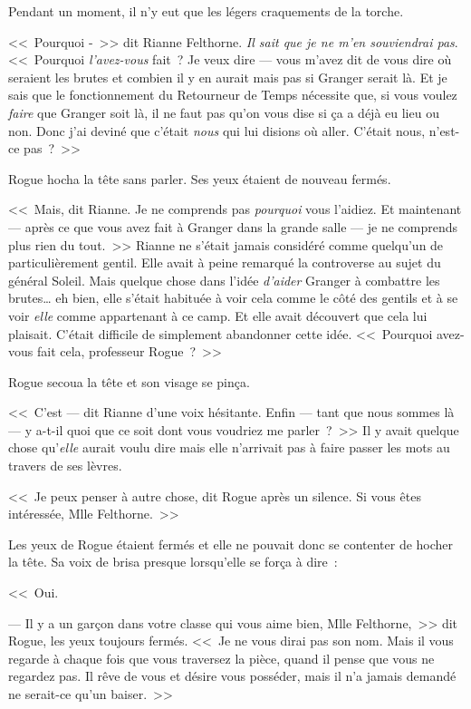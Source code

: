 Pendant un moment, il n'y eut que les légers craquements de la torche.

<<~Pourquoi -~>> dit Rianne Felthorne. \emph{Il sait que je ne m'en souviendrai pas}. <<~Pourquoi \emph{l'avez-vous} fait~? Je veux dire — vous m'avez dit de vous dire où seraient les brutes et combien il y en aurait mais pas si Granger serait là. Et je sais que le fonctionnement du Retourneur de Temps nécessite que, si vous voulez \emph{faire} que Granger soit là, il ne faut pas qu'on vous dise si ça a déjà eu lieu ou non. Donc j'ai deviné que c'était \emph{nous} qui lui disions où aller. C'était nous, n'est-ce pas~?~>>

Rogue hocha la tête sans parler. Ses yeux étaient de nouveau fermés.

<<~Mais, dit Rianne. Je ne comprends pas \emph{pourquoi} vous l'aidiez. Et maintenant — après ce que vous avez fait à Granger dans la grande salle — je ne comprends plus rien du tout.~>> Rianne ne s'était jamais considéré comme quelqu'un de particulièrement gentil. Elle avait à peine remarqué la controverse au sujet du général Soleil. Mais quelque chose dans l'idée \emph{d'aider} Granger à combattre les brutes… eh bien, elle s'était habituée à voir cela comme le côté des gentils et à se voir \emph{elle} comme appartenant à ce camp. Et elle avait découvert que cela lui plaisait. C'était difficile de simplement abandonner cette idée. <<~Pourquoi avez-vous fait cela, professeur Rogue~?~>>

Rogue secoua la tête et son visage se pinça.

<<~C'est — dit Rianne d'une voix hésitante. Enfin — tant que nous sommes là — y a-t-il quoi que ce soit dont vous voudriez me parler~?~>> Il y avait quelque chose qu'\emph{elle} aurait voulu dire mais elle n'arrivait pas à faire passer les mots au travers de ses lèvres.

<<~Je peux penser à autre chose, dit Rogue après un silence. Si vous êtes intéressée, Mlle Felthorne.~>>

Les yeux de Rogue étaient fermés et elle ne pouvait donc se contenter de hocher la tête. Sa voix de brisa presque lorsqu'elle se força à dire~:

<<~Oui.

--- Il y a un garçon dans votre classe qui vous aime bien, Mlle Felthorne,~>> dit Rogue, les yeux toujours fermés. <<~Je ne vous dirai pas son nom. Mais il vous regarde à chaque fois que vous traversez la pièce, quand il pense que vous ne regardez pas. Il rêve de vous et désire vous posséder, mais il n'a jamais demandé ne serait-ce qu'un baiser.~>>

